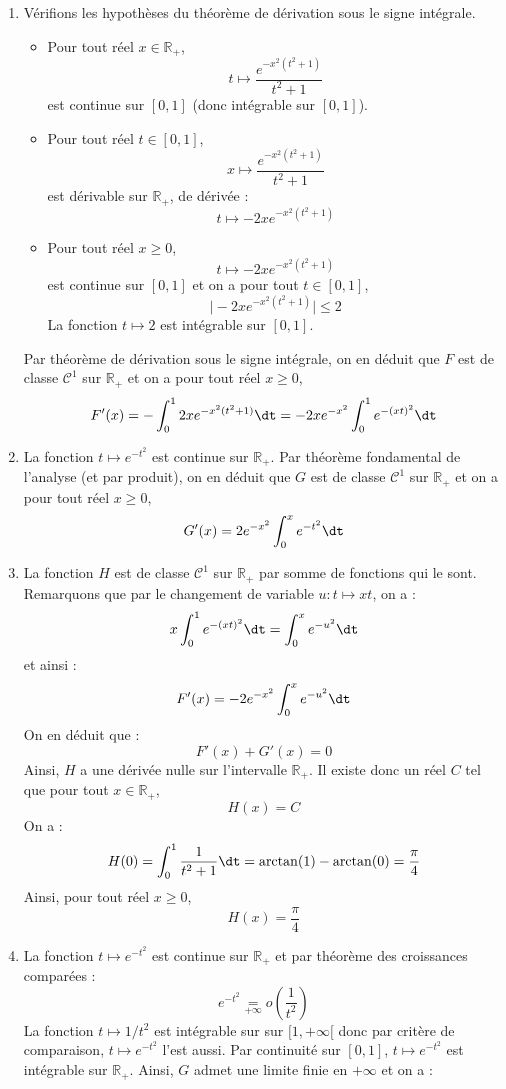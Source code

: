 \documentclass[a4paper,10pt]{report}
\begin{document}
\begin{enumerate}
\item Vérifions les hypothèses du théorème de dérivation sous le signe intégrale.
\begin{itemize}
\item Pour tout réel $x \in \mathbb{R}_+$, 
$$ t \mapsto \frac{e^{-x^2(t^2+1)}}{t^2+1}$$
est continue sur $[0,1]$ (donc intégrable sur $[0,1]$).
\item Pour tout réel $t \in [0,1]$,
$$ x \mapsto \frac{e^{-x^2(t^2+1)}}{t^2+1}$$
est dérivable sur $\mathbb{R}_+$, de dérivée :
$$ t \mapsto - 2xe^{-x^2(t^2+1)}$$
\item Pour tout réel $x \geq 0$,
$$ t \mapsto - 2xe^{-x^2(t^2+1)} $$
est continue sur $[0,1]$ et on a pour tout $t \in [0,1]$,
$$ \vert  - 2xe^{-x^2(t^2+1)} \vert \leq 2$$
La fonction $t \mapsto 2$ est intégrable sur $[0,1]$.
\end{itemize}
Par théorème de dérivation sous le signe intégrale, on en déduit que $F$ est de classe $\mathcal{C}^1$ sur $\mathbb{R}_+$ et on a pour tout réel $x \geq 0$,
$$ F'(x) = - \int_0^1 2x e^{-x^2(t^2+1)} \dt = - 2xe^{-x^2} \int_0^1  e^{-(xt)^2} \dt$$
\item La fonction $t \mapsto e^{-t^2}$ est continue sur $\mathbb{R}_+$. Par théorème fondamental de l'analyse (et par produit), on en déduit que $G$ est de classe $\mathcal{C}^1$ sur $\mathbb{R}_+$ et on a pour tout réel $x \geq 0$,
$$ G'(x) = 2 e^{-x^2} \int_0^x e^{-t^2} \dt$$
\item La fonction $H$ est de classe $\mathcal{C}^1$ sur $\mathbb{R}_+$ par somme de fonctions qui le sont. Remarquons que par le changement de variable $  u : t \mapsto xt$, on a :
$$ x\int_0^1  e^{-(xt)^2} \dt = \int_0^x  e^{-u^2} \dt$$ 
et ainsi :
$$ F'(x) = -2e^{-x^2} \int_0^x  e^{-u^2} \dt$$ 
On en déduit que :
$$ F'(x)+G'(x) = 0$$
Ainsi, $H$ a une dérivée nulle sur l'intervalle $\mathbb{R}_+$. Il existe donc un réel $C$ tel que pour tout $x \in \mathbb{R}_+$,
$$ H(x) = C$$
On a :
$$ H(0) = \int_{0}^1 \frac{1}{t^2+1} \dt = \arctan(1) - \arctan(0) = \dfrac{\pi}{4}$$
Ainsi, pour tout réel $x \geq 0$,
$$ H(x) = \dfrac{\pi}{4}$$
\item La fonction $t \mapsto e^{-t^2}$ est continue sur $\mathbb{R}_+$ et par théorème des croissances comparées :
$$ e^{-t^2} \underset{+ \infty}{=} o \left( \dfrac{1}{t^2} \right)$$
La fonction $t \mapsto 1/t^2$ est intégrable sur sur $[1, + \infty[$ donc par critère de comparaison, $t \mapsto e^{-t^2}$ l'est aussi. Par continuité sur $[0,1]$, $t \mapsto e^{-t^2}$ est intégrable sur $\mathbb{R}_+$. Ainsi, $G$ admet une limite finie en $+ \infty$ et on a :

\end{enumerate}
\end{document}

